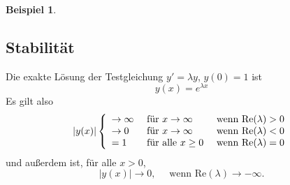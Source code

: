 \documentclass[12pt,a4paper]{book}
\theoremstyle{break}
\newtheorem{beispiel}[theorem]{Beispiel}
\theoremstyle{nonumberplain}
\renewcommand{\Re}{\mathrm{Re}}
\renewcommand{\Im}{\mathrm{Im}}
\newcommand{\1}{\mathbbm{1}} 			      	%
\newcommand{\im}{\ensuremath{\mathrm{i}}} 			      	%
\begin{document}
\begin{beispiel}
\begin{enumerate}[(a)]
\end{enumerate}
\end{beispiel}


\subsection{Stabilität}

Die exakte Lösung der Testgleichung $y'=\lambda y$, $y(0)=1$ ist 
\[
y(x)=e^{\lambda x}%
\]
Es gilt also
\[
|y(x)| \left\{ \begin{array}{l l l} \to \infty & \mbox{ für $x\to \infty$} & \mbox{ wenn } \Re(\lambda)>0 \\
\to 0 & \mbox{ für $x\to \infty$} & \mbox{ wenn } \Re(\lambda)<0 \\
=1 & \mbox{ für alle $x\geq 0$} & \mbox{ wenn } \Re(\lambda)=0
\end{array}\right.
\]
und außerdem ist, für alle $x>0$,
\[
|y(x)|\to 0, \quad \mbox{ wenn } \Re(\lambda)\to -\infty.
\]
\end{document}

